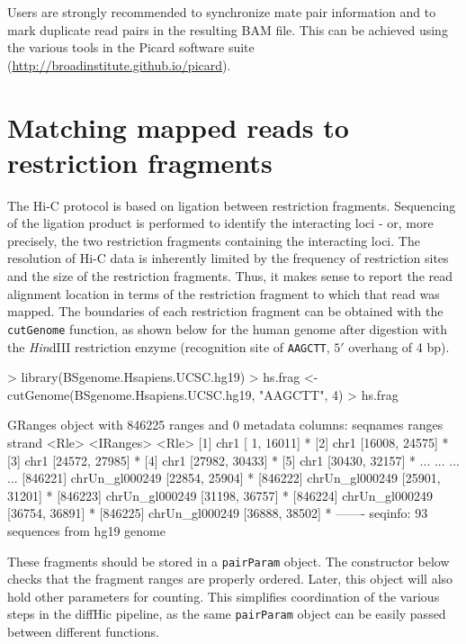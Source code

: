 \documentclass[12pt]{report}
\renewenvironment{Schunk}{\vspace{0pt}}{\vspace{0pt}}
\newcommand{\pkgname}{diffHic}
\newcommand{\code}[1]{{\small\texttt{#1}}}
\begin{document}
Users are strongly recommended to synchronize mate pair information and to mark duplicate read pairs in the resulting BAM file.
This can be achieved using the various tools in the Picard software suite (\url{http://broadinstitute.github.io/picard}).

\section{Matching mapped reads to restriction fragments}
The Hi-C protocol is based on ligation between restriction fragments.
Sequencing of the ligation product is performed to identify the interacting loci -  or, more precisely, the two restriction fragments containing the interacting loci.
The resolution of Hi-C data is inherently limited by the frequency of restriction sites and the size of the restriction fragments.
Thus, it makes sense to report the read alignment location in terms of the restriction fragment to which that read was mapped.
The boundaries of each restriction fragment can be obtained with the \code{cutGenome} function, as shown below for the human genome after digestion with the \textit{Hin}dIII restriction enzyme (recognition site of \code{AAGCTT}, $5'$ overhang of 4 bp).

\begin{Schunk}
\begin{Sinput}
> library(BSgenome.Hsapiens.UCSC.hg19)
> hs.frag <- cutGenome(BSgenome.Hsapiens.UCSC.hg19, "AAGCTT", 4)
> hs.frag
\end{Sinput}
\begin{Soutput}
GRanges object with 846225 ranges and 0 metadata columns:
                 seqnames         ranges strand
                    <Rle>      <IRanges>  <Rle>
       [1]           chr1 [    1, 16011]      *
       [2]           chr1 [16008, 24575]      *
       [3]           chr1 [24572, 27985]      *
       [4]           chr1 [27982, 30433]      *
       [5]           chr1 [30430, 32157]      *
       ...            ...            ...    ...
  [846221] chrUn_gl000249 [22854, 25904]      *
  [846222] chrUn_gl000249 [25901, 31201]      *
  [846223] chrUn_gl000249 [31198, 36757]      *
  [846224] chrUn_gl000249 [36754, 36891]      *
  [846225] chrUn_gl000249 [36888, 38502]      *
  -------
  seqinfo: 93 sequences from hg19 genome
\end{Soutput}
\end{Schunk}

These fragments should be stored in a \code{pairParam} object.
The constructor below checks that the fragment ranges are properly ordered.
Later, this object will also hold other parameters for counting.
This simplifies coordination of the various steps in the \pkgname{} pipeline, as the same \code{pairParam} object can be easily passed between different functions. 
\end{document}

